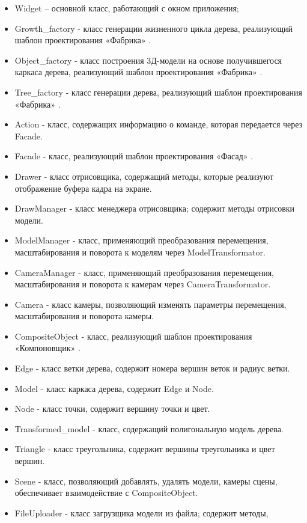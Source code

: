 \documentclass[54pt, a4paper]{article}
\begin{document}
	\begin{itemize}
		\item Widget – основной класс, работающий с окном приложения;
		\item Growth\_factory - класс генерации жизненного цикла дерева, реализующий шаблон проектирования «Фабрика» \cite{patterns}.
		\item Object\_factory - класс построения 3Д-модели на основе получившегося каркаса дерева, реализующий шаблон проектирования «Фабрика» \cite{patterns}.
		\item Tree\_factory - класс генерации дерева, реализующий шаблон проектирования «Фабрика» \cite{patterns}.
		\item Action - класс, содержащих информацию о команде, которая передается через Facade.
		\item Facade - класс, реализующий шаблон проектирования «Фасад» \cite{patterns}.
		\item Drawer - класс отрисовщика, содержащий методы, которые реализуют отображение буфера кадра на экране.
		\item DrawManager -  класс менеджера отрисовщика; содержит методы отрисовки модели.
		\item ModelManager - класс, применяющий преобразования перемещения, масштабирования и поворота к моделям через ModelTransformator.
		\item CameraManager - класс, применяющий преобразования перемещения, масштабирования и поворота к камерам через CameraTransformator.
		\item Camera - класс камеры, позволяющий изменять параметры перемещения, масштабирования и поворота камеры.
		\item CompositeObject - класс, реализующий шаблон проектирования «Компоновщик» \cite{patterns}.
		\item Edge - класс ветки дерева, содержит номера вершин веток и радиус ветки.
		\item Model - класс каркаса дерева, содержит Edge и Node.
		\item Node - класс точки, содержит вершину точки и цвет.
		\item Transformed\_model - класс, содержащий полигональную модель дерева.
		\item Triangle - класс треугольника, содержит вершины треугольника и цвет вершин.
		\item Scene - класс, позволяющий добавлять, удалять модели, камеры сцены, обеспечивает взаимодействие с CompositeObject.
		\item FileUploader - класс загрузщика модели из файла; содержит методы,

\end{itemize}
\end{document}
